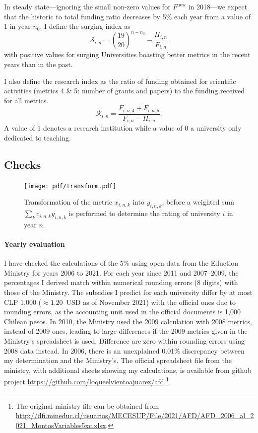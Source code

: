 \documentclass[twocolumn]{article}
\def\Fnew{\ensuremath{F^\text{new}}}
\begin{document}
In steady state---ignoring the small non-zero values for $\Fnew$ in 2018---we expect that the historic to total funding ratio decreases by 5\% each year from a value of 1 in year $n_0$. I define the surging index as
\begin{equation}
    \mathcal{S}_{i,n} = \left(\frac{19}{20}\right)^{n-n_0}
                             - \frac{H_{i,n}}{F_{i, n}}
\end{equation}
with positive values for surging Universities boasting better metrics in the recent years than in the past.

I also define the research index as the ratio of funding obtained for scientific activities (metrics 4 \& 5: number of grants and papers) to the funding received for all metrics.
\begin{equation}
    \mathcal{R}_{i,n} = \frac {F_{i,n,4} + F_{i,n,5}}
                            {F_{i,n} - H_{i,n}}.
\end{equation}
A value of 1 denotes a research institution while a value of 0 a university only dedicated to teaching.

\subsection{Checks}
\begin{figure}
\centering
\texttt{[image: pdf/transform.pdf]}
\caption{Transformation of the metric $x_{i,n,k}$ into $y_{i,n,k}$, before a weighted sum 
$\sum_k c_{i,n,k} y_{i,n,k}$ is performed to determine the rating of university $i$ in year $n$.}
\label{fig:transform}
\end{figure}

\paragraph{Yearly evaluation} I have checked the calculations of the 5\% using open data from the Eduction Ministry for years 2006 to 2021. For each year since 2011 and 2007--2009, the percentages I
derived match within numerical rounding errors (8 digits) with those of the Ministry. The subsidies I predict for each university differ by at most CLP 1,000 ($\approx 1.20$~USD as of November 2021) with the official ones due to rounding errors, as the accounting unit used in the
official documents is 1,000 Chilean pesos. In 2010, the Ministry used the 2009
calculation with 2008 metrics, instead of 2009 ones, leading to large differences if the 2009 metrics given in the Ministry's spreadsheet is used.  Difference are zero within rounding errors using 2008 data instead. In 2006, there is an unexplained 0.01\% discrepancy between my determination and the Ministry's.  The official spreadsheet file from the ministry, with additional sheets showing my calculations, is available from github project \url{https://github.com/loqueelvientoajuarez/afd}.\footnote{The original ministry file can
be obtained from \url{http://dfi.mineduc.cl/usuarios/MECESUP/File/2021/AFD/AFD_2006_al_2021_MontosVariables5xc.xlsx}.}. 
\end{document}
